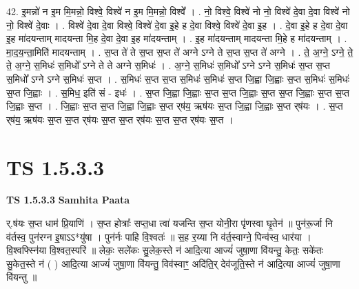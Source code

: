 \documentclass[17pt]{extarticle}
\begin{document}
42. इ॒मन्नो॑ न इ॒म मि॒मन्नो॒ विश्वे॒ विश्वे॑ न इ॒म मि॒मन्नो॒ विश्वे᳚ । . नो॒ विश्वे॒ विश्वे॑ नो नो॒ विश्वे॑ दे॒वा दे॒वा विश्वे॑ नो नो॒ विश्वे॑ दे॒वाः । . विश्वे॑ दे॒वा दे॒वा विश्वे॒ विश्वे॑ दे॒वा इ॒हे ह दे॒वा विश्वे॒ विश्वे॑ दे॒वा इ॒ह । . दे॒वा इ॒हे ह दे॒वा दे॒वा इ॒ह मा॑दयन्ताम् मादयन्ता मि॒ह दे॒वा दे॒वा इ॒ह मा॑दयन्ताम् । . इ॒ह मा॑दयन्ताम् मादयन्ता मि॒हे ह मा॑दयन्ताम् । . मा॒द॒य॒न्ता॒मिति॑ मादयन्ताम् । . स॒प्त ते॑ ते स॒प्त स॒प्त ते॑ अग्ने ऽग्ने ते स॒प्त स॒प्त ते॑ अग्ने । . ते॒ अ॒ग्ने॒ ऽग्ने॒ ते॒ ते॒ अ॒ग्ने॒ स॒मिधः॑ स॒मिधो᳚ ऽग्ने ते ते अग्ने स॒मिधः॑ । . अ॒ग्ने॒ स॒मिधः॑ स॒मिधो᳚ ऽग्ने ऽग्ने स॒मिधः॑ स॒प्त स॒प्त स॒मिधो᳚ ऽग्ने ऽग्ने स॒मिधः॑ स॒प्त । . स॒मिधः॑ स॒प्त स॒प्त स॒मिधः॑ स॒मिधः॑ स॒प्त जि॒ह्वा जि॒ह्वाः स॒प्त स॒मिधः॑ स॒मिधः॑ स॒प्त जि॒ह्वाः । . स॒मिध॒ इति॑ सं - इधः॑ । . स॒प्त जि॒ह्वा जि॒ह्वाः स॒प्त स॒प्त जि॒ह्वाः स॒प्त स॒प्त जि॒ह्वाः स॒प्त स॒प्त जि॒ह्वाः स॒प्त । . जि॒ह्वाः स॒प्त स॒प्त जि॒ह्वा जि॒ह्वाः स॒प्त र्‌ष॑य॒ ऋष॑यः स॒प्त जि॒ह्वा जि॒ह्वाः स॒प्त र्‌ष॑यः । . स॒प्त र्‌ष॑य॒ ऋष॑यः स॒प्त स॒प्त र्‌ष॑यः स॒प्त स॒प्त र्‌ष॑यः स॒प्त स॒प्त र्‌ष॑यः स॒प्त । \newline
\pagebreak
{}
\section*{ TS 1.5.3.3 }

\textbf{TS 1.5.3.3 } \newline
\textbf{Samhita Paata} \newline

र्.ष॑यः स॒प्त धाम॑ प्रि॒याणि॑ । स॒प्त होत्राः᳚ सप्त॒धा त्वा॑ यजन्ति स॒प्त योनी॒रा पृ॑णस्वा घृ॒तेन॑ ॥ पुन॑रू॒र्जा नि व॑र्तस्व॒ पुन॑रग्न इ॒षाऽऽ*यु॑षा । पुन॑र्नः पाहि वि॒श्वतः॑ ॥ स॒ह र॒य्या नि व॑र्त॒स्वाग्ने॒ पिन्व॑स्व॒ धार॑या । वि॒श्वफ्स्नि॑या वि॒श्वत॒स्परि॑ ॥ लेकः॒ सले॑कः सु॒लेक॒स्ते न॑ आदि॒त्या आज्यं॑ जुषा॒णा वि॑यन्तु॒ केतः॒ सके॑तः सु॒केत॒स्ते न॑ ( ) आदि॒त्या आज्यं॑ जुषा॒णा वि॑यन्तु॒ विव॑स्वाꣳ॒॒ अदि॑ति॒र् देव॑जूति॒स्ते न॑ आदि॒त्या आज्यं॑ जुषा॒णा वि॑यन्तु ॥ \newline
\end{document}
